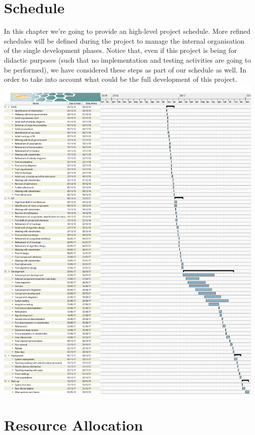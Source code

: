 \documentclass{article}
\begin{document}
\begin{flushleft}
\section{Schedule} %
In this chapter we're going to provide an high-level project schedule. More refined schedules will be defined during the project to manage the internal organisation of the single development phases.
Notice that, even if this project is being for didactic purposes (such that no implementation and testing activities are going to be performed), we have considered these steps as part of our schedule as well. In order to take into account what could be the full development of this project.
\newpage
\includegraphics[scale=0.3]{gantt1}


\section{Resource Allocation} %


\end{flushleft}
\end{document}
